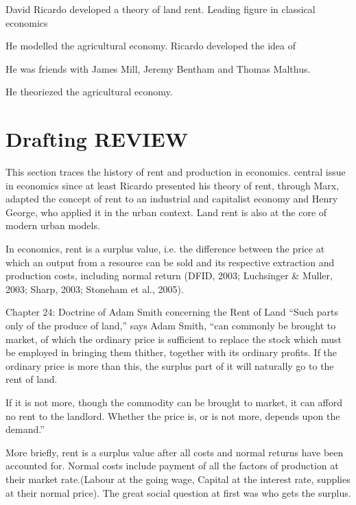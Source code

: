  David Ricardo developed a theory of land rent.
Leading figure in classical economics



He modelled the agricultural economy.
Ricardo developed the idea of 

He was friends with James Mill, Jeremy Bentham and Thomas Malthus.

He theoriezed the agricultural economy.





\section{Drafting REVIEW}
This section traces the history of rent and production in economics.
 central issue in economics since at least Ricardo presented his theory of  rent, through Marx, adapted the concept of rent to an industrial and capitalist economy and Henry George, who applied it in the urban context. Land rent is also at the core of modern urban models.  


In economics, rent is a surplus value, i.e. the difference between the price at which an output from a resource can be sold and its respective extraction and production costs, including normal return (DFID, 2003; Luchsinger \& M\:uller, 2003; Sharp, 2003; Stoneham et al., 2005).

Chapter 24: Doctrine of Adam Smith concerning the Rent of Land
``Such parts only of the produce of land,” says Adam Smith, ``can commonly be brought to market, of which the ordinary price is sufficient to replace the stock which must be employed in bringing them thither, together with its ordinary profits. If the ordinary price is more than this, the surplus part of it will naturally go to the rent of land.

If it is not more, though the commodity can be brought to market, it can afford no rent to the landlord. Whether the price is, or is not more, depends upon the demand.''

More briefly, rent is a surplus value after all costs and normal returns have been accounted for. Normal costs include  payment of all the factors of production at their market rate.(Labour at the going wage, Capital at the interest rate, supplies at their normal price). The great social question at first was who gets the surplus.  


